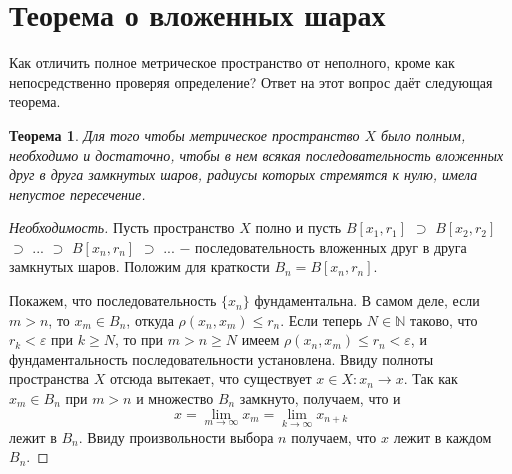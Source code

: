 \documentclass{article}
\newtheorem{theorem}{Теорема}[section]
\begin{document}
\section{Теорема о вложенных шарах}

Как отличить полное метрическое пространство от неполного, кроме как непосредственно проверяя определение? Ответ на этот вопрос даёт следующая теорема.

\begin{theorem}
Для того чтобы метрическое пространство \(X\) было полным, необходимо и достаточно, чтобы в нем всякая последовательность вложенных друг в друга замкнутых шаров, радиусы которых стремятся к нулю, имела непустое пересечение.
\end{theorem}

\begin{proof}[Необходимость]
Пусть пространство \(X\) полно и пусть \(B[x_1, r_1]\) \(\supset\) \(B[x_2, r_2]\) \(\supset\) ... \(\supset\) \(B[x_n, r_n]\) \(\supset\) ... \(-\) последовательность вложенных друг в друга замкнутых шаров. Положим для краткости \(B_n = B[x_n, r_n]\).

Покажем, что последовательность \(\{x_n\}\) фундаментальна. В самом деле, если \(m > n\), то \(x_m \in B_n\), откуда \(\rho(x_n, x_m) \leq r_n\). Если теперь \(N \in \mathbb{N}\) таково, что \(r_k < \varepsilon\) при \(k \geq N\), то при \(m > n \geq N\) имеем \(\rho(x_n, x_m) \leq r_n < \varepsilon\), и фундаментальность последовательности установлена. Ввиду полноты пространства \(X\) отсюда вытекает, что существует \(x \in X : x_n \to x\). Так как \(x_m \in B_n\) при \(m > n\) и множество \(B_n\) замкнуто, получаем, что и
\[
x = \lim\limits_{m \to \infty} {x_m} = \lim\limits_{k \to \infty} {x_{n + k}}
\]
лежит в \(B_n\). Ввиду произвольности выбора \(n\) получаем, что \(x\) лежит в каждом \(B_n\).
\end{proof}
\end{document}
